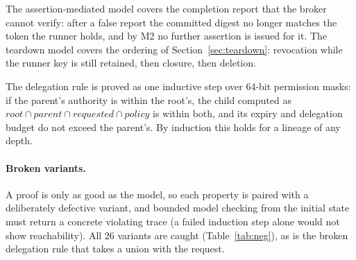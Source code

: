 \documentclass[11pt]{article}
\begin{document}
The assertion-mediated model covers the completion report that the broker cannot verify: after a false report the committed digest no longer matches the token the runner holds, and by M2 no further assertion is issued for it. The teardown model covers the ordering of Section~\ref{sec:teardown}: revocation while the runner key is still retained, then closure, then deletion.

The delegation rule is proved as one inductive step over 64-bit permission masks: if the parent's authority is within the root's, the child computed as $\mathit{root} \cap \mathit{parent} \cap \mathit{requested} \cap \mathit{policy}$ is within both, and its expiry and delegation budget do not exceed the parent's. By induction this holds for a lineage of any depth.

\paragraph{Broken variants.} A proof is only as good as the model, so each property is paired with a deliberately defective variant, and bounded model checking from the initial state must return a concrete violating trace (a failed induction step alone would not show reachability). All 26 variants are caught (Table~\ref{tab:neg}), as is the broken delegation rule that takes a union with the request.
\end{document}
